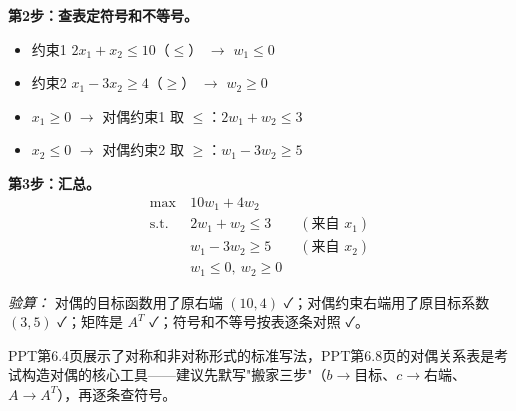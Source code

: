 {\textbf{第2步：查表定符号和不等号。}
\begin{itemize}
  \item 约束1 $2x_1+x_2\le10$（$\le$） $\to$ $w_1 \le 0$
  \item 约束2 $x_1-3x_2\ge4$（$\ge$） $\to$ $w_2 \ge 0$
  \item $x_1\ge0$ $\to$ 对偶约束1 取 $\le$：$2w_1 + w_2 \le 3$
  \item $x_2\le0$ $\to$ 对偶约束2 取 $\ge$：$w_1 - 3w_2 \ge 5$
\end{itemize}

\textbf{第3步：汇总。}
\[
\begin{aligned}
\max\ & 10w_1 + 4w_2 \\
\text{s.t.}\ & 2w_1 + w_2 \le 3 \qquad (\text{来自 }x_1)\\
& w_1 - 3w_2 \ge 5 \qquad (\text{来自 }x_2)\\
& w_1 \le 0,\ w_2 \ge 0
\end{aligned}
\]

\emph{验算：} 对偶的目标函数用了原右端 $(10,4)$ ✓；对偶约束右端用了原目标系数 $(3,5)$ ✓；矩阵是 $A^T$ ✓；符号和不等号按表逐条对照 ✓。}

\medskip
PPT第6.4页展示了对称和非对称形式的标准写法，PPT第6.8页的对偶关系表是考试构造对偶的核心工具——建议先默写"搬家三步"（$b\to$目标、$c\to$右端、$A\to A^T$），再逐条查符号。
\medskip
{}
\medskip


\medskip
{}
\medskip

